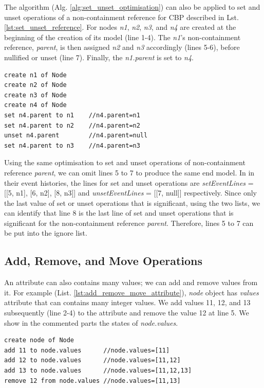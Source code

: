 \documentclass{llncs}
\begin{document}
The algorithm (Alg. \ref{alg:set_unset_optimisation}) can also be applied to set and unset operations of a non-containment reference for CBP described in Lst. \ref{lst:set_unset_reference}. For nodes \emph{n1}, \emph{n2}, \emph{n3}, and \emph{n4} are created at the beginning of the creation of its model (line 1-4). The \emph{n1}'s non-containment reference, \emph{parent}, is then assigned \emph{n2} and \emph{n3} accordingly (lines 5-6), before nullified or unset (line 7). Finally, the \emph{n1.parent} is set to \emph{n4}. 

\begin{lstlisting}[style=eol,caption={Example of CBP representation of \emph{name} reference assignments.},label=lst:set_unset_reference]
create n1 of Node
create n2 of Node
create n3 of Node
create n4 of Node
set n4.parent to n1    //n4.parent=n1
set n4.parent to n2    //n4.parent=n2
unset n4.parent        //n4.parent=null
set n4.parent to n3    //n4.parent=n3
\end{lstlisting}

Using the same optimisation to set and unset operations of non-containment reference \emph{parent}, we can omit lines 5 to 7 to produce the same end model. In in their event histories, the lines for set and unset operations are \emph{setEventLines} = [[5, n1], [6, n2], [8, n3]] and \emph{unsetEventLines} = [[7, null]] respectively. Since only the last value of set or unset operations that is significant, using the two lists, we can identify that line 8 is the last line of set and unset operations that is significant for the non-containment reference \emph{parent}. Therefore, lines 5 to 7 can be put into the ignore list.

\subsection{Add, Remove, and Move Operations}
\label{subsec:add_remove_and_move_operations}
An attribute can also contains many values; we can add and remove values from it. For example (List. \ref{lst:add_remove_move_attribute}), \emph{node} object has \emph{values} attribute that can contains many integer values. We add values 11, 12, and 13 subsequently (line 2-4) to the attribute and remove the value 12 at line 5. We show in the commented parts the states of \emph{node.values}.  

\begin{lstlisting}[style=eol,caption={Example of CBP representation of attribute \emph{values}'s add and remove operations.},label=lst:add_remove_move_attribute]
create node of Node
add 11 to node.values      //node.values=[11] 
add 12 to node.values      //node.values=[11,12] 
add 13 to node.values      //node.values=[11,12,13] 
remove 12 from node.values //node.values=[11,13] 
\end{lstlisting}
\end{document}
